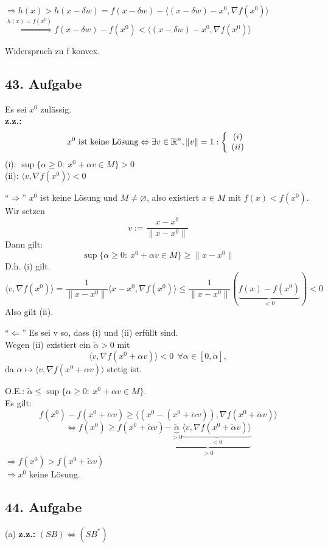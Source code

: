\documentclass[a4paper,11pt,twoside,titlepage]{article}
\newcommand{\R}{{\mathbb R}}
\begin{document}
$\Rightarrow h(x)>h(x-\delta w)=f(x-\delta w)-\langle(x-\delta w)-x^0,\nabla f(x^0)\rangle$\\
$\stackrel{h(x)=f(x^0)}{\Rightarrow}f(x-\delta w)-f(x^0)<\langle(x-\delta w)-x^0,\nabla f(x^0)\rangle$

Widerspruch zu f konvex.

\subsection*{43. Aufgabe}
Es sei $x^0$ zulässig.\\
\textbf{z.z.:}
\[x^0 \textnormal{ ist keine Lösung} \Leftrightarrow \exists v\in\R^n,\|v\|=1:\left\{\begin{array}{c}(i)\\(ii)\end{array}\right.\]
(i): $\sup\{\alpha\geq0:\ x^0+\alpha v\in M\}>0$\\
(ii): $\langle v,\nabla f(x^0)\rangle <0$

"`$\Rightarrow$"' $x^0$ ist keine Lösung und $M\neq\varnothing$, also existiert $x\in M$ mit $f(x)<f(x^0)$.\\
Wir setzen 
\[v:=\frac{x-x^0}{\|x-x^0\|}\]
Dann gilt:
\[\sup\{\alpha\geq0:\ x^0+\alpha v\in M\}\geq\|x-x^0\|\]
D.h. (i) gilt.
\[\langle v,\nabla f(x^0)\rangle=\frac{1}{\|x-x^0\|}\langle x-x^0,\nabla f(x^0)\rangle\leq \frac{1}{\|x-x^0\|}(\underbrace{f(x)-f(x^0)}_{<0})<0\]
Also gilt (ii).

"`$\Leftarrow$"' Es sei v so, dass (i) und (ii) erfüllt sind.\\
Wegen (ii) existiert ein $\tilde\alpha>0$ mit
\[\langle v,\nabla f(x^0+\alpha v)\rangle <0\ \ \forall\alpha\in[0,\tilde\alpha],\]
da $\alpha\mapsto\langle v,\nabla f(x^0+\alpha v)\rangle$ stetig ist.

O.E.: $\tilde\alpha\leq\sup\{\alpha\geq0:\ x^0+\alpha v\in M\}$.\\
Es gilt:
\[f(x^0)-f(x^0+\tilde\alpha v)\geq\langle(x^0-(x^0+\tilde\alpha v)),\nabla f(x^0+\tilde\alpha v)\rangle\]
\[\Leftrightarrow f(x^0)\geq f(x^0+\tilde\alpha v)\underbrace{-\underbrace{\tilde\alpha}_{>0}\underbrace{\langle v,\nabla f(x^0+\tilde\alpha v)\rangle}_{<0}}_{>0}\]
$\Rightarrow f(x^0)>f(x^0+\tilde\alpha v)$\\
$\Rightarrow x^0$ keine Lösung.

\subsection*{44. Aufgabe}
(a) \textbf{z.z.:} $(SB)\Leftrightarrow(SB^*)$
\end{document}
